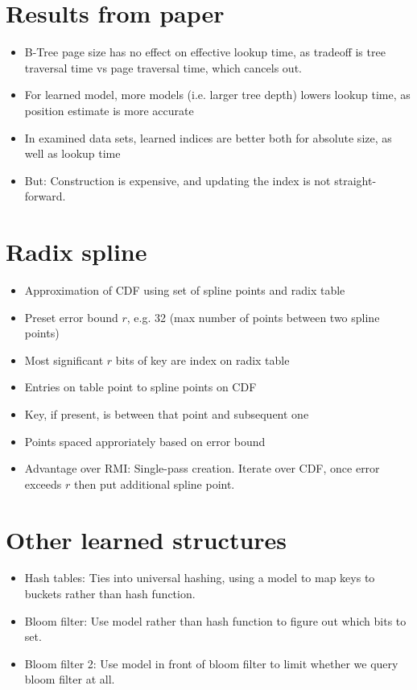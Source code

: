 \documentclass[a4paper]{scrreprt}
\begin{document}
\section{Results from paper}

\begin{itemize}
		\item B-Tree page size has no effect on effective lookup time, as
				tradeoff is tree traversal time vs page traversal time, which
				cancels out.
		\item For learned model, more models (i.e. larger tree depth) lowers
				lookup time, as position estimate is more accurate
		\item In examined data sets, learned indices are better both for
				absolute size, as well as lookup time
		\item But: Construction is expensive, and updating the index is not
				straight-forward.
\end{itemize}

\section{Radix spline}

\begin{itemize}
		\item Approximation of CDF using set of spline points and radix table
		\item Preset error bound $r$, e.g. 32 (max number of points between two
				spline points)
		\item Most significant $r$ bits of key are index on radix table
		\item Entries on table point to spline points on CDF
		\item Key, if present, is between that point and subsequent one
		\item Points spaced approriately based on error bound
		\item Advantage over RMI: Single-pass creation. Iterate over CDF, once
				error exceeds $r$ then put additional spline point.
\end{itemize}

\section{Other learned structures}

\begin{itemize}
		\item Hash tables: Ties into universal hashing, using a model to
				map keys to buckets rather than hash function.
		\item Bloom filter: Use model rather than hash function to figure out
				which bits to set.
		\item Bloom filter 2: Use model in front of bloom filter to limit
				whether we query bloom filter at all.
\end{itemize}
\end{document}
